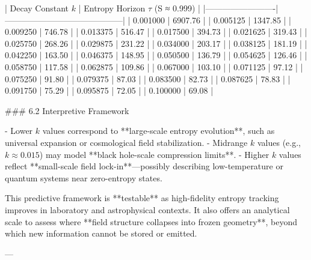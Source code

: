 | Decay Constant \( k \) | Entropy Horizon \( \tau \) (S ≈ 0.999) |
|-------------------------|------------------------------------------|
| 0.001000                | 6907.76                                  |
| 0.005125                | 1347.85                                  |
| 0.009250                | 746.78                                   |
| 0.013375                | 516.47                                   |
| 0.017500                | 394.73                                   |
| 0.021625                | 319.43                                   |
| 0.025750                | 268.26                                   |
| 0.029875                | 231.22                                   |
| 0.034000                | 203.17                                   |
| 0.038125                | 181.19                                   |
| 0.042250                | 163.50                                   |
| 0.046375                | 148.95                                   |
| 0.050500                | 136.79                                   |
| 0.054625                | 126.46                                   |
| 0.058750                | 117.58                                   |
| 0.062875                | 109.86                                   |
| 0.067000                | 103.10                                   |
| 0.071125                | 97.12                                    |
| 0.075250                | 91.80                                    |
| 0.079375                | 87.03                                    |
| 0.083500                | 82.73                                    |
| 0.087625                | 78.83                                    |
| 0.091750                | 75.29                                    |
| 0.095875                | 72.05                                    |
| 0.100000                | 69.08                                    |

### 6.2 Interpretive Framework

- Lower \( k \) values correspond to **large-scale entropy evolution**, such as universal expansion or cosmological field stabilization.
- Midrange \( k \) values (e.g., \( k \approx 0.015 \)) may model **black hole-scale compression limits**.
- Higher \( k \) values reflect **small-scale field lock-in**—possibly describing low-temperature or quantum systems near zero-entropy states.

This predictive framework is **testable** as high-fidelity entropy tracking improves in laboratory and astrophysical contexts. It also offers an analytical scale to assess where **field structure collapses into frozen geometry**, beyond which new information cannot be stored or emitted.

---